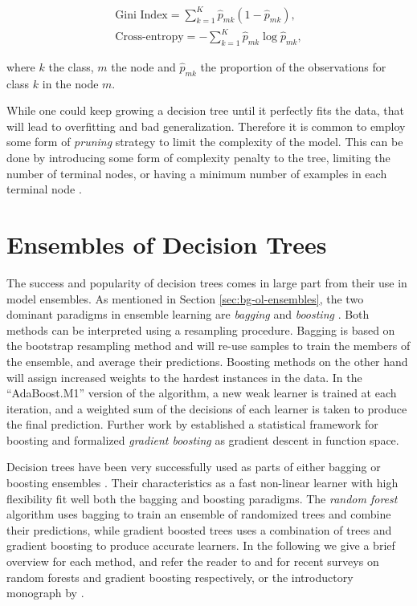 \begin{equation}
	\begin{split}
		\text{Gini Index} = \sum_{k=1}^K\hat{p}_{mk}(1 - \hat{p}_{mk}), \\
		\text{Cross-entropy} = -\sum_{k=1}^K\hat{p}_{mk} \log{\hat{p}_{mk}},
	\end{split}
\end{equation}

\noindent
where $k$ the class, $m$ the node and $\hat{p}_{mk}$ the proportion of
the observations for class $k$ in the node $m$.

While one could keep growing a decision tree until it perfectly fits the data,
that will lead to overfitting and bad generalization. Therefore
it is common to employ some form of \emph{pruning} strategy to limit the
complexity of the model. This can be done by introducing some
form of complexity penalty to the tree, limiting the number of terminal
nodes, or having a minimum number of examples in each terminal node
\cite{breiman1984cart}.


\section{Ensembles of Decision Trees}
\label{sec:bg-dt-ensembles}

The success and popularity of decision trees comes in large part
from their use in model ensembles.
As mentioned in Section \ref{sec:bg-ol-ensembles}, the two dominant paradigms in ensemble learning are \emph{bagging} \cite{bagging} and
\emph{boosting} \cite{boosting-schapire, boosting-freund-schapire}. Both
methods can be interpreted using a resampling procedure. Bagging is
based on the bootstrap \cite{bootstrap} resampling method and will re-use samples
to train the members of the ensemble, and average their predictions.
Boosting methods on the other hand will assign increased weights to the
hardest instances in the data. In the ``AdaBoost.M1'' version of the algorithm,
a new weak learner is trained at each iteration, and a weighted sum of
the decisions of each learner is taken to produce the final prediction.
Further work by \citet{gradient-boosting-breiman} established a statistical framework
for boosting and formalized \emph{gradient boosting} as gradient descent in function
space.

Decision trees have been very successfully used as parts of either bagging
or boosting ensembles \cite{hundreds-classifiers}. Their characteristics as a fast
non-linear learner
with high flexibility fit well both the bagging and boosting paradigms.
The \emph{random forest} algorithm uses bagging to train an ensemble
of randomized trees and combine their predictions, while gradient boosted trees
uses a combination of trees and gradient boosting to produce
accurate learners. In the following we give a brief overview for each method,
and refer the reader to \cite{random-forest-survey, tree-survey} and \cite{biau-optimization} for recent surveys on
random forests and gradient boosting respectively, or the introductory monograph by \citet{esl}.

